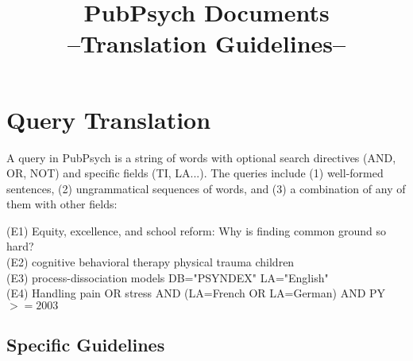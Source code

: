 \documentclass[a4paper,10pt]{article}
\title{PubPsych Documents \\ --Translation Guidelines--}
\author{}
\newcommand{\exTit}[1]{\begin{tcolorbox}[enhanced,attach boxed title to top center={yshift=-3mm,yshifttext=-1mm},title=Examples,coltitle=black,colbacktitle=white]{#1}\end{tcolorbox}}
\begin{document}
\maketitle

% 

\section{Query Translation}
\label{s:queries}
A query in PubPsych is a string of words with optional search directives (AND, OR, NOT) and specific fields (TI, LA...). 
The queries include (1) well-formed sentences, (2) ungrammatical sequences of words, and (3) a combination of any of them with other fields:


\medskip
\exTit{(E1) Equity, excellence, and school reform: Why is finding common ground so hard? \\
(E2) cognitive behavioral therapy physical trauma children \\
(E3) process-dissociation models DB="PSYNDEX" LA="English" \\
(E4) Handling pain OR stress AND (LA=French OR LA=German) AND PY$>=2003$}



\subsection{Specific Guidelines}
\label{ss:q_guidelines}
\end{document}
